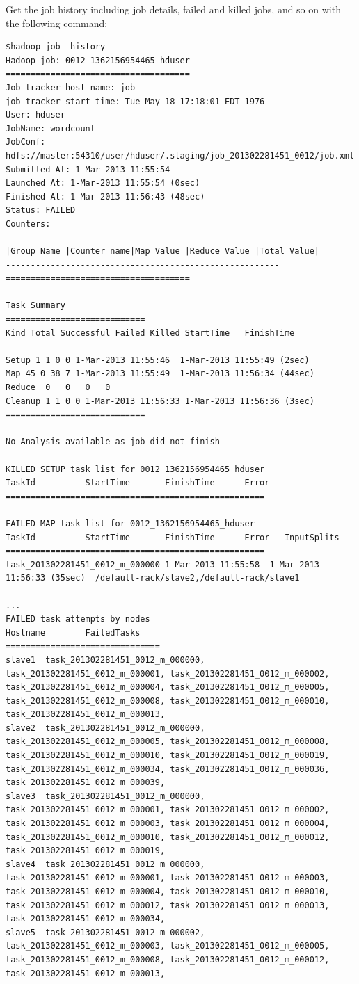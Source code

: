 Get the job history including job details, failed and killed jobs, and so on with the following command: 
\lstset{style=bashstyle}
\begin{lstlisting}
$hadoop job -history
Hadoop job: 0012_1362156954465_hduser
=====================================
Job tracker host name: job
job tracker start time: Tue May 18 17:18:01 EDT 1976
User: hduser
JobName: wordcount
JobConf: hdfs://master:54310/user/hduser/.staging/job_201302281451_0012/job.xml
Submitted At: 1-Mar-2013 11:55:54
Launched At: 1-Mar-2013 11:55:54 (0sec)
Finished At: 1-Mar-2013 11:56:43 (48sec)
Status: FAILED
Counters:

|Group Name |Counter name|Map Value |Reduce Value |Total Value|
-------------------------------------------------------
=====================================

Task Summary
============================
Kind Total Successful Failed Killed StartTime   FinishTime

Setup 1 1 0 0 1-Mar-2013 11:55:46  1-Mar-2013 11:55:49 (2sec)
Map 45 0 38 7 1-Mar-2013 11:55:49  1-Mar-2013 11:56:34 (44sec)
Reduce  0   0   0   0
Cleanup 1 1 0 0 1-Mar-2013 11:56:33 1-Mar-2013 11:56:36 (3sec)
============================

No Analysis available as job did not finish

KILLED SETUP task list for 0012_1362156954465_hduser
TaskId          StartTime       FinishTime      Error
====================================================

FAILED MAP task list for 0012_1362156954465_hduser
TaskId          StartTime       FinishTime      Error   InputSplits
====================================================
task_201302281451_0012_m_000000 1-Mar-2013 11:55:58  1-Mar-2013 11:56:33 (35sec)  /default-rack/slave2,/default-rack/slave1

...
FAILED task attempts by nodes
Hostname        FailedTasks
===============================
slave1  task_201302281451_0012_m_000000, task_201302281451_0012_m_000001, task_201302281451_0012_m_000002, task_201302281451_0012_m_000004, task_201302281451_0012_m_000005, task_201302281451_0012_m_000008, task_201302281451_0012_m_000010, task_201302281451_0012_m_000013,
slave2  task_201302281451_0012_m_000000, task_201302281451_0012_m_000005, task_201302281451_0012_m_000008, task_201302281451_0012_m_000010, task_201302281451_0012_m_000019, task_201302281451_0012_m_000034, task_201302281451_0012_m_000036, task_201302281451_0012_m_000039,
slave3  task_201302281451_0012_m_000000, task_201302281451_0012_m_000001, task_201302281451_0012_m_000002, task_201302281451_0012_m_000003, task_201302281451_0012_m_000004, task_201302281451_0012_m_000010, task_201302281451_0012_m_000012, task_201302281451_0012_m_000019,
slave4  task_201302281451_0012_m_000000, task_201302281451_0012_m_000001, task_201302281451_0012_m_000003, task_201302281451_0012_m_000004, task_201302281451_0012_m_000010, task_201302281451_0012_m_000012, task_201302281451_0012_m_000013, task_201302281451_0012_m_000034,
slave5  task_201302281451_0012_m_000002, task_201302281451_0012_m_000003, task_201302281451_0012_m_000005, task_201302281451_0012_m_000008, task_201302281451_0012_m_000012, task_201302281451_0012_m_000013,


\end{lstlisting}
